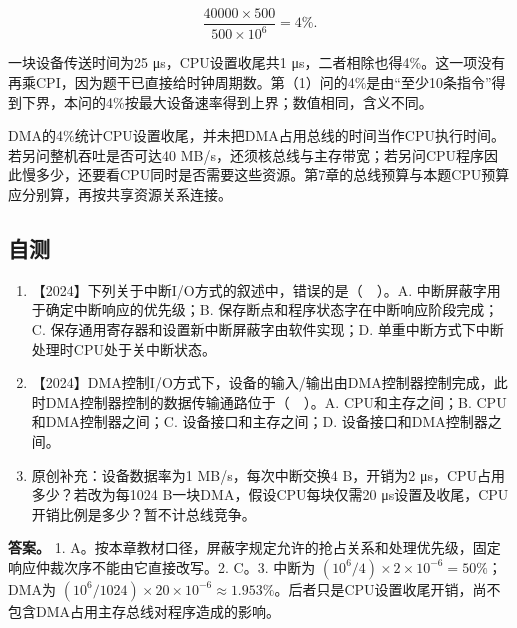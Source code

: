 \[
\frac{40000\times500}{500\times10^6}=4\%.
\]

一块设备传送时间为25 μs，CPU设置收尾共1 μs，二者相除也得4\%。这一项没有再乘CPI，因为题干已直接给时钟周期数。第（1）问的4\%是由``至少10条指令''得到下界，本问的4\%按最大设备速率得到上界；数值相同，含义不同。

DMA的4\%统计CPU设置收尾，并未把DMA占用总线的时间当作CPU执行时间。若另问整机吞吐是否可达40 MB/s，还须核总线与主存带宽；若另问CPU程序因此慢多少，还要看CPU同时是否需要这些资源。第7章的总线预算与本题CPU预算应分别算，再按共享资源关系连接。

\subsection{自测}\label{co-self8}

\begin{enumerate}
\def\labelenumi{\arabic{enumi}.}
\tightlist
\item
  【2024】下列关于中断I/O方式的叙述中，错误的是（　）。A. 中断屏蔽字用于确定中断响应的优先级；B. 保存断点和程序状态字在中断响应阶段完成；C. 保存通用寄存器和设置新中断屏蔽字由软件实现；D. 单重中断方式下中断处理时CPU处于关中断状态。
\item
  【2024】DMA控制I/O方式下，设备的输入/输出由DMA控制器控制完成，此时DMA控制器控制的数据传输通路位于（　）。A. CPU和主存之间；B. CPU和DMA控制器之间；C. 设备接口和主存之间；D. 设备接口和DMA控制器之间。
\item
  原创补充：设备数据率为1 MB/s，每次中断交换4 B，开销为2 μs，CPU占用多少？若改为每1024 B一块DMA，假设CPU每块仅需20 μs设置及收尾，CPU开销比例是多少？暂不计总线竞争。
\end{enumerate}

\textbf{答案。} 1. A。按本章教材口径，屏蔽字规定允许的抢占关系和处理优先级，固定响应仲裁次序不能由它直接改写。2. C。3. 中断为 \((10^6/4)\times2\times10^{-6}=50\%\)；DMA为 \((10^6/1024)\times20\times10^{-6}\approx1.953\%\)。后者只是CPU设置收尾开销，尚不包含DMA占用主存总线对程序造成的影响。
